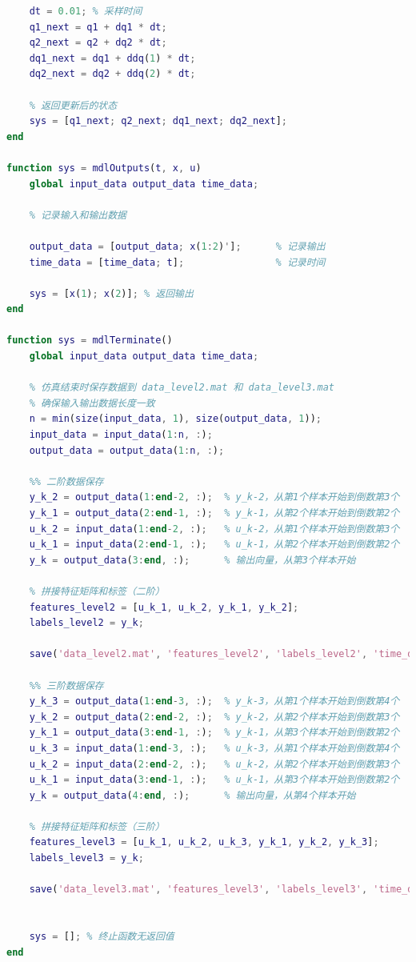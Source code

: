 \documentclass[12pt,a4paper,UTF8]{article}
\begin{document}
\begin{lstlisting}[language=Matlab,caption=arm.m——2-DOF 机械臂的物理模型 S-function实现]
    % 离散状态更新（积分）
    dt = 0.01; % 采样时间
    q1_next = q1 + dq1 * dt;
    q2_next = q2 + dq2 * dt;
    dq1_next = dq1 + ddq(1) * dt;
    dq2_next = dq2 + ddq(2) * dt;

    % 返回更新后的状态
    sys = [q1_next; q2_next; dq1_next; dq2_next];
end

function sys = mdlOutputs(t, x, u)
    global input_data output_data time_data;

    % 记录输入和输出数据
    
    output_data = [output_data; x(1:2)'];      % 记录输出
    time_data = [time_data; t];                % 记录时间

    sys = [x(1); x(2)]; % 返回输出
end

function sys = mdlTerminate()
    global input_data output_data time_data;

    % 仿真结束时保存数据到 data_level2.mat 和 data_level3.mat
    % 确保输入输出数据长度一致
    n = min(size(input_data, 1), size(output_data, 1));
    input_data = input_data(1:n, :);
    output_data = output_data(1:n, :);

    %% 二阶数据保存
    y_k_2 = output_data(1:end-2, :);  % y_k-2，从第1个样本开始到倒数第3个
    y_k_1 = output_data(2:end-1, :);  % y_k-1，从第2个样本开始到倒数第2个
    u_k_2 = input_data(1:end-2, :);   % u_k-2，从第1个样本开始到倒数第3个
    u_k_1 = input_data(2:end-1, :);   % u_k-1，从第2个样本开始到倒数第2个
    y_k = output_data(3:end, :);      % 输出向量，从第3个样本开始

    % 拼接特征矩阵和标签（二阶）
    features_level2 = [u_k_1, u_k_2, y_k_1, y_k_2];
    labels_level2 = y_k;

    save('data_level2.mat', 'features_level2', 'labels_level2', 'time_data');

    %% 三阶数据保存
    y_k_3 = output_data(1:end-3, :);  % y_k-3，从第1个样本开始到倒数第4个
    y_k_2 = output_data(2:end-2, :);  % y_k-2，从第2个样本开始到倒数第3个
    y_k_1 = output_data(3:end-1, :);  % y_k-1，从第3个样本开始到倒数第2个
    u_k_3 = input_data(1:end-3, :);   % u_k-3，从第1个样本开始到倒数第4个
    u_k_2 = input_data(2:end-2, :);   % u_k-2，从第2个样本开始到倒数第3个
    u_k_1 = input_data(3:end-1, :);   % u_k-1，从第3个样本开始到倒数第2个
    y_k = output_data(4:end, :);      % 输出向量，从第4个样本开始

    % 拼接特征矩阵和标签（三阶）
    features_level3 = [u_k_1, u_k_2, u_k_3, y_k_1, y_k_2, y_k_3];
    labels_level3 = y_k;

    save('data_level3.mat', 'features_level3', 'labels_level3', 'time_data');


    sys = []; % 终止函数无返回值
end
    
\end{lstlisting}
\end{document}
